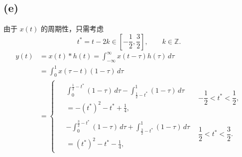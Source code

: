 \documentclass[UTF8, fontset=fandol,12pt, a4paper]{ctexart}
\begin{document}
\begin{center}

\end{center}

\newpage
\subsection* {(e)}
由于 $x(t)$ 的周期性，只需考虑
\[
  t^*=t-2k\in\left[-\frac12,\frac32\right],\qquad k\in\mathbb{Z}.
\]
\begin{align*}
  y(t) &= x(t)*h(t)
        = \int_{-\infty}^{\infty}x(t-\tau)h(\tau)\,d\tau \\
       &= \int_{0}^{1}x(\tau-t)(1-\tau)\,d\tau \\
       &= \begin{cases}
          \begin{aligned}
            &\displaystyle\int_{0}^{\frac12-t^*}(1-\tau)\,d\tau
             -\int_{\frac12-t^*}^{1}(1-\tau)\,d\tau\\[0.3em]
            &\displaystyle=-(t^*)^2-t^*+\frac14,
          \end{aligned}
          &-\dfrac12<t^*<\dfrac12,\\[1.2em]
          \begin{aligned}
            &\displaystyle-\int_{0}^{\frac32-t^*}(1-\tau)\,d\tau
             +\int_{\frac32-t^*}^{1}(1-\tau)\,d\tau\\[0.3em]
            &\displaystyle=(t^*)^2-t^*-\frac14,
          \end{aligned}
          &\dfrac12<t^*<\dfrac32.
        \end{cases}
\end{align*}
\end{document}
